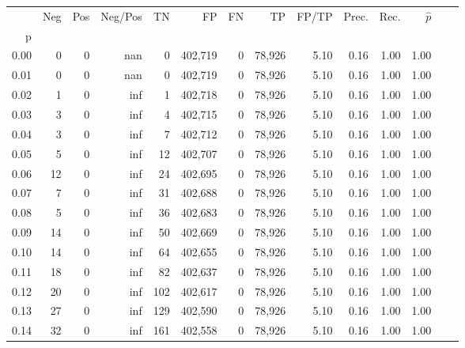 \begin{tabular}{rrrrrrrrrrrrrr}
\toprule
{} &     Neg &    Pos &  Neg/Pos &       TN &       FP &      FN &      TP & FP/TP & Prec. &  Rec. & $\hat{p}$ \\
p    &         &        &          &          &          &         &         &       &       &       &           \\
\midrule
0.00 &       0 &      0 &      nan &        0 &  402,719 &       0 &  78,926 &  5.10 &  0.16 &  1.00 &      1.00 \\
0.01 &       0 &      0 &      nan &        0 &  402,719 &       0 &  78,926 &  5.10 &  0.16 &  1.00 &      1.00 \\
0.02 &       1 &      0 &      inf &        1 &  402,718 &       0 &  78,926 &  5.10 &  0.16 &  1.00 &      1.00 \\
0.03 &       3 &      0 &      inf &        4 &  402,715 &       0 &  78,926 &  5.10 &  0.16 &  1.00 &      1.00 \\
0.04 &       3 &      0 &      inf &        7 &  402,712 &       0 &  78,926 &  5.10 &  0.16 &  1.00 &      1.00 \\
0.05 &       5 &      0 &      inf &       12 &  402,707 &       0 &  78,926 &  5.10 &  0.16 &  1.00 &      1.00 \\
0.06 &      12 &      0 &      inf &       24 &  402,695 &       0 &  78,926 &  5.10 &  0.16 &  1.00 &      1.00 \\
0.07 &       7 &      0 &      inf &       31 &  402,688 &       0 &  78,926 &  5.10 &  0.16 &  1.00 &      1.00 \\
0.08 &       5 &      0 &      inf &       36 &  402,683 &       0 &  78,926 &  5.10 &  0.16 &  1.00 &      1.00 \\
0.09 &      14 &      0 &      inf &       50 &  402,669 &       0 &  78,926 &  5.10 &  0.16 &  1.00 &      1.00 \\
0.10 &      14 &      0 &      inf &       64 &  402,655 &       0 &  78,926 &  5.10 &  0.16 &  1.00 &      1.00 \\
0.11 &      18 &      0 &      inf &       82 &  402,637 &       0 &  78,926 &  5.10 &  0.16 &  1.00 &      1.00 \\
0.12 &      20 &      0 &      inf &      102 &  402,617 &       0 &  78,926 &  5.10 &  0.16 &  1.00 &      1.00 \\
0.13 &      27 &      0 &      inf &      129 &  402,590 &       0 &  78,926 &  5.10 &  0.16 &  1.00 &      1.00 \\
0.14 &      32 &      0 &      inf &      161 &  402,558 &       0 &  78,926 &  5.10 &  0.16 &  1.00 &      1.00 \\

\end{tabular}
